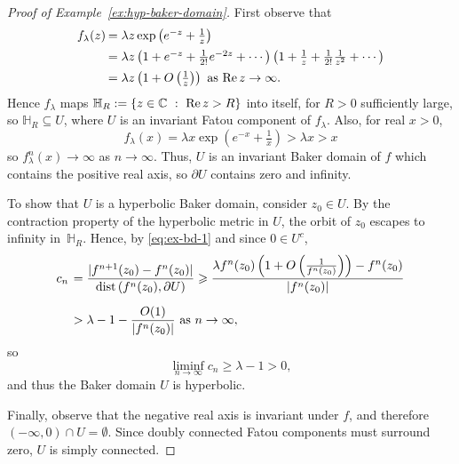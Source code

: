\documentclass[a4paper, 12pt, reqno]{amsart}
\numberwithin{equation}{section}
\newcommand{\ds}{\displaystyle}
\theoremstyle{plain}
\theoremstyle{definition}
\theoremstyle{remark}
\newcommand{\C}{{\mathbb{C}}}
\begin{document}
\begin{proof}[Proof of Example~\ref{ex:hyp-baker-domain}]
First observe that 
\begin{equation}
\begin{array}{rl}
f_\lambda(z)\hspace*{-8pt} & =\lambda z\exp\left(e^{-z}+\tfrac{1}{z}\right)\vspace{5pt}\\
& = \lambda z\left(1+e^{-z}+\tfrac{1}{2!}e^{-2z}+\cdots\right)\left(1+\tfrac{1}{z}+\tfrac{1}{2!}\tfrac{1}{z^2}+\cdots   \right)\vspace{5pt}\\
& = \lambda z\left(1+O\left(\tfrac{1}{z}\right)\right) \mbox{ as } \textup{Re}\,z\to\infty.
\end{array}
\label{eq:ex-bd-1}
\end{equation}
Hence $f_\lambda$ maps $\mathbb H_R:=\{z\in\C\ :\ \textup{Re}\,z>R\}$ into itself, for $R>0$ sufficiently large, so $\mathbb H_R\subseteq U$, where $U$ is an invariant Fatou component of $f_\lambda$. Also, for real $x>0$,
$$
f_\lambda(x)=\lambda x\exp\left(e^{-x}+\tfrac{1}{x}\right)>\lambda x>x
$$
so $f_\lambda^n(x)\to\infty$ as $n\to \infty$. Thus, $U$ is an invariant Baker domain of $f$ which contains the positive real axis, so $\partial U$ contains zero and infinity.

To show that $U$ is a hyperbolic Baker domain, consider $z_0\in U$. By the contraction property of the hyperbolic metric in $U$, the orbit of $z_0$ escapes to infinity in~$\mathbb H_R$. Hence, by \eqref{eq:ex-bd-1} and since $0\in U^c$,
$$
\begin{array}{rl}
c_n\hspace*{-6pt} &\ds=\frac{|f^{n+1}(z_0)-f^n(z_0)|}{\textup{dist}\,(f^n(z_0),\partial U)}\geqslant \frac{\lambda f^n(z_0)\left(1+O\left(\frac{1}{f^n(z_0)}\right)\right)-f^n(z_0)}{|f^n(z_0)|}\vspace{10pt}\\
&\ds>\lambda -1 -\frac{O(1)}{|f^n(z_0)|} \mbox{ as } n\to \infty,
\end{array}
$$
so
$$
\liminf_{n\to\infty} c_n\geqslant \lambda-1>0,
$$
and thus the Baker domain $U$ is hyperbolic.

Finally, observe that the negative real axis is invariant under $f$, and therefore $(-\infty,0)\cap U=\emptyset$. Since doubly connected Fatou components must surround zero, $U$ is simply connected.
\end{proof}
\end{document}

